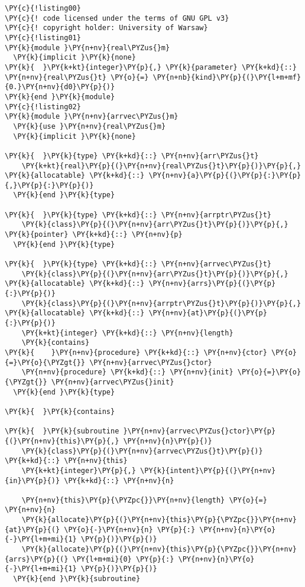 \begin{Verbatim}[commandchars=\\\{\}]
\PY{c}{!listing00}
\PY{c}{! code licensed under the terms of GNU GPL v3}
\PY{c}{! copyright holder: University of Warsaw}
\PY{c}{!listing01}
\PY{k}{module }\PY{n+nv}{real\PYZus{}m}
  \PY{k}{implicit }\PY{k}{none}
\PY{k}{  }\PY{k+kt}{integer}\PY{p}{,} \PY{k}{parameter} \PY{k+kd}{::} \PY{n+nv}{real\PYZus{}t} \PY{o}{=} \PY{n+nb}{kind}\PY{p}{(}\PY{l+m+mf}{0.}\PY{n+nv}{d0}\PY{p}{)} 
\PY{k}{end }\PY{k}{module}
\PY{c}{!listing02}
\PY{k}{module }\PY{n+nv}{arrvec\PYZus{}m}
  \PY{k}{use }\PY{n+nv}{real\PYZus{}m}
  \PY{k}{implicit }\PY{k}{none}

\PY{k}{  }\PY{k}{type} \PY{k+kd}{::} \PY{n+nv}{arr\PYZus{}t}
    \PY{k+kt}{real}\PY{p}{(}\PY{n+nv}{real\PYZus{}t}\PY{p}{)}\PY{p}{,} \PY{k}{allocatable} \PY{k+kd}{::} \PY{n+nv}{a}\PY{p}{(}\PY{p}{:}\PY{p}{,}\PY{p}{:}\PY{p}{)}
  \PY{k}{end }\PY{k}{type}

\PY{k}{  }\PY{k}{type} \PY{k+kd}{::} \PY{n+nv}{arrptr\PYZus{}t}
    \PY{k}{class}\PY{p}{(}\PY{n+nv}{arr\PYZus{}t}\PY{p}{)}\PY{p}{,} \PY{k}{pointer} \PY{k+kd}{::} \PY{n+nv}{p}
  \PY{k}{end }\PY{k}{type}

\PY{k}{  }\PY{k}{type} \PY{k+kd}{::} \PY{n+nv}{arrvec\PYZus{}t}
    \PY{k}{class}\PY{p}{(}\PY{n+nv}{arr\PYZus{}t}\PY{p}{)}\PY{p}{,} \PY{k}{allocatable} \PY{k+kd}{::} \PY{n+nv}{arrs}\PY{p}{(}\PY{p}{:}\PY{p}{)}
    \PY{k}{class}\PY{p}{(}\PY{n+nv}{arrptr\PYZus{}t}\PY{p}{)}\PY{p}{,} \PY{k}{allocatable} \PY{k+kd}{::} \PY{n+nv}{at}\PY{p}{(}\PY{p}{:}\PY{p}{)}
    \PY{k+kt}{integer} \PY{k+kd}{::} \PY{n+nv}{length}
    \PY{k}{contains}
\PY{k}{    }\PY{n+nv}{procedure} \PY{k+kd}{::} \PY{n+nv}{ctor} \PY{o}{=}\PY{o}{\PYZgt{}} \PY{n+nv}{arrvec\PYZus{}ctor}
    \PY{n+nv}{procedure} \PY{k+kd}{::} \PY{n+nv}{init} \PY{o}{=}\PY{o}{\PYZgt{}} \PY{n+nv}{arrvec\PYZus{}init}
  \PY{k}{end }\PY{k}{type}

\PY{k}{  }\PY{k}{contains}

\PY{k}{  }\PY{k}{subroutine }\PY{n+nv}{arrvec\PYZus{}ctor}\PY{p}{(}\PY{n+nv}{this}\PY{p}{,} \PY{n+nv}{n}\PY{p}{)}
    \PY{k}{class}\PY{p}{(}\PY{n+nv}{arrvec\PYZus{}t}\PY{p}{)} \PY{k+kd}{::} \PY{n+nv}{this}
    \PY{k+kt}{integer}\PY{p}{,} \PY{k}{intent}\PY{p}{(}\PY{n+nv}{in}\PY{p}{)} \PY{k+kd}{::} \PY{n+nv}{n}

    \PY{n+nv}{this}\PY{p}{\PYZpc{}}\PY{n+nv}{length} \PY{o}{=} \PY{n+nv}{n}
    \PY{k}{allocate}\PY{p}{(}\PY{n+nv}{this}\PY{p}{\PYZpc{}}\PY{n+nv}{at}\PY{p}{(} \PY{o}{-}\PY{n+nv}{n} \PY{p}{:} \PY{n+nv}{n}\PY{o}{-}\PY{l+m+mi}{1} \PY{p}{)}\PY{p}{)}
    \PY{k}{allocate}\PY{p}{(}\PY{n+nv}{this}\PY{p}{\PYZpc{}}\PY{n+nv}{arrs}\PY{p}{(} \PY{l+m+mi}{0} \PY{p}{:} \PY{n+nv}{n}\PY{o}{-}\PY{l+m+mi}{1} \PY{p}{)}\PY{p}{)}
  \PY{k}{end }\PY{k}{subroutine}


\end{Verbatim}
